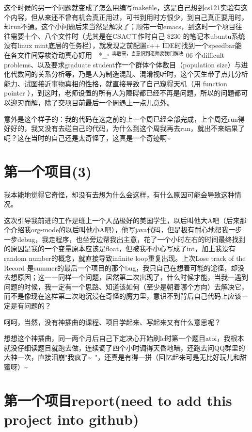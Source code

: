 \documentclass[12pt]{book}
\begin{document}
这个时候的另一个问题就变成了怎么用编写makefile，这是自己想到cs121实验有这个内容，但从来还不曾有机会真正用过，可书到用时方恨少，到自己真正要用时，却run不通。这个小问题后来当然是解决了；顺带一句emacs，到这时一个项目往往需要十个、八个文件时（尤其是在CSAC工作时自己 \$230 的笔记本ubuntu系统没有linux mint底层的任务栏），就发现之前配置c++ IDE时找到一个speedbar能在各文件间穿梭游动真心好用　*\_$^{\text{。再后来，当意识到老师要我们解决}}$ 06 个difficult problems、以及要求graduate student作一个群体个体数目（population size）与进化代数间的关系分析等，乃是人为制造混乱、混淆视听时，这个天生带了点儿分析能力、试图接近事物真相的性格，就直接导致了自己窥得天机（用 function pointer ），到这时，老师设置的所有人为障碍都已经不再是问题，所以的问题都可以迎刃而解，除了交项目前最后一个周遇上一点儿意外。

意外是这个样子的：我的代码在这之前的上一个周已经全部完成，上个周还run得好好的，我又没有去碰自己的代码，为什么到这个周我再去run，就出不来结果了呢？这在当时的自己还是太奇怪了，这真是一个奇迹啊\textasciitilde{}~

\section{第一个项目(3)}
\label{sec-24-3}

我本能地觉得它奇怪，却没有去想为什么会这样，有什么原因可能会导致这种情况。

这次引导我前进的工作是班上一个人品极好的美国学生，以后叫他大A吧（后来那个介绍我org-mode的以后叫他小A吧），他写java代码，但是极有耐心地帮我一步一步debug，我走程序，也坐旁边帮我出主意，花了一个小时左右的时间最终找到的原因是我的一个变量原本应该是float，但被我不小心写成了int，加上我没有random number的概念，就直接导致infinite loop重复出现。上次Lose track of the Record 是summer的最后一个项目的那个bug，我只自己在想着可能的途径，却没去想原因；这一一同样一个问题，居然第二次出现了，什么时候才能，当我一遇到问题的时候，我一定有一个思路、知道该如何（至少是朝着哪个方向）去解决它，而不是像现在这样第二次地沉浸在奇怪的魔力里，意识不到背后自己代码上应该一定是有问题的？

呵呵，当然，没有神插曲的课程、项目学起来、写起来又有什么意思呢？

想想这个神插曲，同一两个月后自己下定决心开始刷lc时第一个题目atoi，我根本就没仔细读题目就跑去做，连续调了四个小时调得天昏地暗，还跑去问QQ群里的大神一次，直接泪崩"我疯了\textasciitilde{}~"，还真是有得一拼（回忆起来可是无比好玩儿和甜蜜呀）\textasciitilde{}~　

\section{第一个项目report(need to add this project into github)}
\label{sec-24-4}
\end{document}

